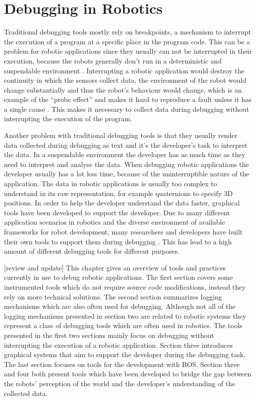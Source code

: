 \chapter{Debugging in Robotics}


Traditional debugging tools mostly rely on breakpoints, a mechanism to interrupt the execution of a program at a specific place in the program code. This can be a problem for robotic applications since they usually can not be interrupted in their execution, because the robots generally don't run in a deterministic and suspendable environment \cite{Gumbley2009}. Interrupting a robotic application would destroy the continuity in which the sensors collect data, the environment of the robot would change substantially and thus the robot's behaviour would change, which is an example of the ``probe effect'' and makes it hard to reproduce a fault unless it has a single cause \cite{Gumbley2009}. This makes it necessary to collect data during debugging without interrupting the execution of the program.

Another problem with traditional debugging tools is that they usually render data collected during debugging as text and it's the developer's task to interpret the data. In a suspendable environment the developer has as much time as they need to interpret and analyse the data. When debugging robotic applications the developer usually has a lot less time, because of the uninterruptible nature of the application. The data in robotic applications is usually too complex to understand in its raw representation, for example quaternions to specify 3D positions. In order to help the developer understand the data faster, graphical tools have been developed to support the developer. Due to many different application scenarios in robotics and the diverse environment of available frameworks for robot development, many researchers and developers have built their own tools to support them during debugging \cite{Collett2010}. This has lead to a high amount of different debugging tools for different purposes.

[review and update]
This chapter gives an overview of tools and practices currently in use to debug robotic applications. The first section covers some instrumented tools which do not require source code modifications, instead they rely on more technical solutions. The second section summarizes logging mechanisms which are also often used for debugging. Although not all of the logging mechanisms presented in section two are related to robotic systems they represent a class of debugging tools which are often used in robotics. The tools presented in the first two sections mainly focus on debugging without interrupting the execution of a robotic application. Section three introduces graphical systems that aim to support the developer during the debugging task. The last section focuses on tools for the development with ROS. Section three and four both present tools which have been developed to bridge the gap between the robots' perception of the world and the developer's understanding of the collected data.

